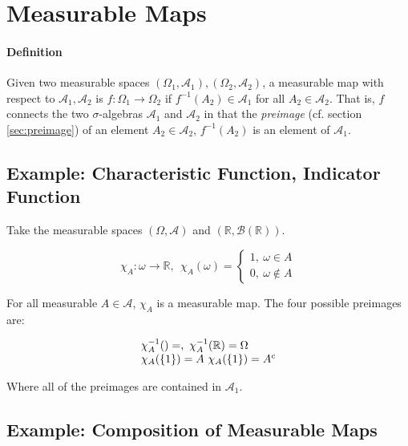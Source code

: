   
\section{Measurable Maps}
\paragraph{Definition} Given two measurable spaces $(\Omega_1,\mathscr{A}_1), (\Omega_2, \mathscr{A}_2)$, a measurable map with respect to $\mathscr{A}_1, \mathscr{A}_2$ is $f:\Omega_1 \rightarrow \Omega_2$ if $f^{-1}(A_2)\in\mathscr{A}_1$ for all $A_2 \in \mathscr{A}_2$. That is, $f$ connects the two $\sigma$-algebras $\mathscr{A}_1$ and $\mathscr{A}_2$ in that the \textit{preimage} (cf. section \ref{sec:preimage}) of an element $A_2 \in \mathscr{A}_2$, $f^{-1}(A_2)$ is an element of $\mathscr{A}_1$. 




\subsection{Example: Characteristic Function, Indicator Function}
Take the measurable spaces $(\Omega,\mathscr{A})$ and $(\mathbb{R},\mathscr{B}(\mathbb{R}))$. 

\begin{equation}
\chi_A: \omega \rightarrow \mathbb{R},\ \ \chi_A(\omega) = \left\{\begin{array}{l} 1,\ \omega\in A\\ 0,\ \omega\notin A \end{array}\right.
\end{equation}

For all measurable $A\in\mathscr{A}$, $\chi_A$ is a measurable map. The four possible preimages are:

\begin{equation}
\begin{array}{l}
\chi_A^{-1}(\empty) = \empty,\ \chi_A^{-1}(\mathbb{R}) = \Omega\\
\chi_A(\{ 1 \}) = A\ \chi_A(\{ 1 \}) = A^c
\end{array}
\end{equation}

Where all of the preimages are contained in $\mathscr{A}_1$.


\subsection{Example: Composition of Measurable Maps}

